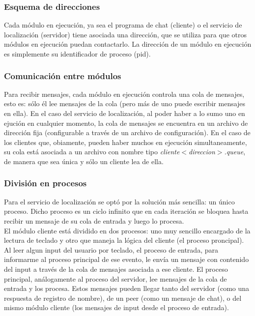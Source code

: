 \subsubsection{Esquema de direcciones}

Cada módulo en ejecución, ya sea el programa de chat (cliente) o el servicio de localización (servidor) tiene asociada una dirección, que se utiliza para que otros módulos en ejecución puedan contactarlo. La dirección de un módulo en ejecución es simplemente su identificador de proceso (pid). \\

\subsubsection{Comunicación entre módulos}

Para recibir mensajes, cada módulo en ejecución controla una cola de mensajes, esto es: sólo él lee mensajes de la cola (pero más de uno puede escribir mensajes en ella). En el caso del servicio de localización, al poder haber a lo sumo uno en ejución en cualquier momento, la cola de mensajes se encuentra en un archivo de dirección fija (configurable a través de un archivo de configuración). En el caso de los clientes que, obiamente, pueden haber muchos en ejecución simultaneamente, su cola está asociada a un archivo con nombre tipo \emph{cliente$<$direccion$>$.queue}, de manera que sea única y sólo un cliente lea de ella.

\subsubsection{División en procesos}

Para el servicio de localización se optó por la solución más sencilla: un único proceso. Dicho proceso es un ciclo infinito que en cada iteración se bloquea hasta recibir un mensaje de su cola de entrada y luego lo procesa. \\

El módulo cliente está dividido en dos procesos: uno muy sencillo encargado de la lectura de teclado y otro que maneja la lógica del cliente (el proceso proncipal). Al leer algun input del usuario por teclado, el proceso de entrada, para informarme al proceso principal de ese evento, le envía un mensaje con contenido del input a través de la cola de mensajes asociada a ese cliente. El proceso principal, análogamente al proceso del servidor, lee mensajes de la cola de entrada y los procesa. Estos mensajes pueden llegar tanto del servidor (como una respuesta de registro de nombre), de un peer (como un mensaje de chat), o del mismo módulo cliente (los mensajes de input desde el proceso de entrada).

